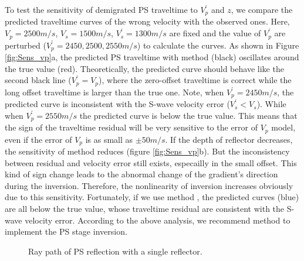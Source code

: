 To
test the sensitivity of demigrated PS traveltime to $V^{'}_p$ and $z$, we compare the predicted traveltime
curves of the wrong velocity with the observed ones.
Here, $V_p=2500m/s$, $V_s=1500m/s$, $V^{'}_s=1300m/s$ are fixed and the value of $V^{'}_p$
are perturbed ($V^{'}_p=2450, 2500, 2550m/s$) to calculate the curves.
As shown in Figure \ref{fig:Sens_vp}a, 
the predicted PS traveltime with method
 (black) oscillates around the true value (red). 
Theoretically, the predicted
curve should behave like the second black line ($V^{'}_p=V_p$), where the zero-offset traveltime is correct while
the long offset traveltime is larger than the true one. Note, when $V^{'}_p=2450m/s$, the
predicted curve is inconsistent with the S-wave velocity error
($V^{'}_s<V_s$). While when $V^{'}_p=2550m/s$ the predicted curve is below the true value. 
This means that the sign of the traveltime residual will be very sensitive to the error of $V_p$ model,  
even if the error of $V_p$ is as small as $\pm50m/s$. 
If the depth of reflector decreases, the sensitivity of method  reduces (figure \ref{fig:Sens_vp}b). But the
inconsistency between residual and velocity error still exists, especailly in the small offset.
This kind of sign change leads to 
the abnormal change of the gradient's direction during the inversion. Therefore, the nonlinearity of
inversion increases obviously due to this sensitivity. Fortunately, if we use method  ,
the predicted curves (blue) are all below the true value, whose traveltime residual are consistent
with the S-wave velocity error.
According to the above analysis, we recommend method  to implement the PS stage inversion.
\begin{figure}
   \centering
   \caption{Ray path of PS reflection with a single reflector.}
   \label{fig:PS_refl}
\end{figure}

